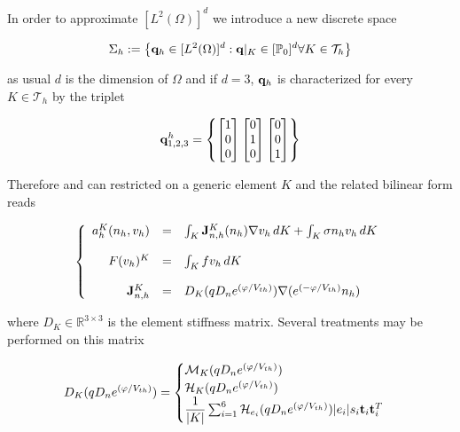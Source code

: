 In order to approximate $[L^2(\Omega)]^d$ we introduce a new discrete space

\begin{equation}
\Sigma_h := \left\{   \mathbf{q}_h \in  [L^2(\Omega)]^d : \mathbf{q}|_{K} \in [\mathbb{P}_0]^d \forall K \in \mathcal{T}_h\right\}
\end{equation} 

as usual $d$ is the dimension of $\Omega$ and if $d=3$, $\mathbf{q}_h$ is characterized for every $K \in \mathcal{T}_h$ by the triplet

\begin{equation}
\label{eq: form of qh}
\mathbf{q}^h_{1,2,3} = \left\{ \begin{bmatrix} 1 \\ 0 \\ 0 \end{bmatrix}  \begin{bmatrix} 0 \\ 1 \\ 0 \end{bmatrix}  \begin{bmatrix} 0 \\ 0 \\ 1 \end{bmatrix}  \right\}
\end{equation}

Therefore  and  can restricted on a generic element $K$ and the related bilinear form reads

\begin{equation}
\label{eq: LEC discretized general}
\left\{
\begin{array}{rcl}
a_h^K(n_h,v_h) & = & \int_{K}\mathbf{ J}_{n,h}^K(n_h) \nabla v_h \, dK + \int_{K} \sigma n_h v_h \, dK 
\\
\\
F(v_h)^K & = & \int_K f v_h \, dK
\\
\\
\mathbf{J}_{n,h}^K & = & D_K(qD_n e^{(\varphi/V_{th})}) \nabla  (e^{(-\varphi / V_{th})}n_h)
\end{array}
\right.
\end{equation}

where $D_K \in \mathbb{R}^{3\times 3}$ is the element stiffness matrix. Several treatments may be performed on this matrix

\begin{equation}
\label{eq: vari diffusion coeff}
 D_K(qD_n e^{(\varphi/V_{th})}) = 
 	\begin{cases}
		  \mathcal{M}_K(qD_n e^{(\varphi/V_{th})}) \\
		  \mathcal{H}_K(qD_n e^{(\varphi/V_{th})}) \\
 		  \dfrac{1}{|K|}\sum_{i=1}^6 \mathcal{H}_{e_i}(qD_ne^{(\varphi/V_{th})}) |e_i| s_i \mathbf{t}_i \mathbf{t}_i^T
 		 \end{cases}
\end{equation}


